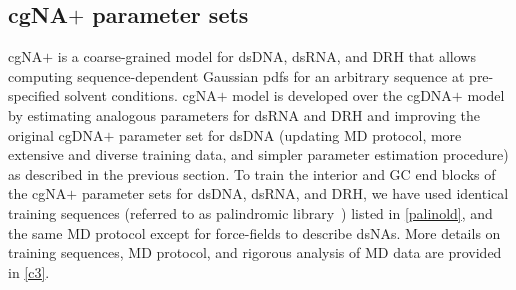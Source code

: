 
\subsection{cgNA$+$ parameter sets}\label{c4:subsec_prm}
cgNA$+$ is a coarse-grained model for dsDNA, dsRNA, and DRH that allows computing sequence-dependent Gaussian pdfs for an arbitrary sequence at pre-specified solvent conditions.
cgNA$+$ model is developed over the cgDNA$+$ model by estimating analogous parameters for dsRNA and DRH and improving the original cgDNA$+$ parameter set for dsDNA (updating MD protocol, more extensive and diverse training data, and simpler parameter estimation procedure) as described in the previous section.
To train the interior and GC end blocks of the cgNA$+$ parameter sets for dsDNA, dsRNA, and DRH, we have used identical training sequences (referred to as palindromic library~\cite{patelithesis}) listed in \cref{palinold}, and the same MD protocol except for force-fields to describe dsNAs.
More details on training sequences, MD protocol, and rigorous analysis of MD data are provided in \cref{c3}. 

